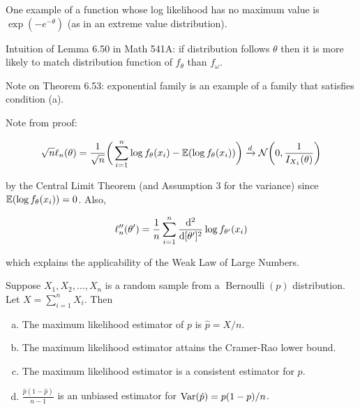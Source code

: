 \begin{remark}One example of a function whose log likelihood has no maximum value is \(\exp(-e^{-\theta})\) (as in an extreme value distribution). 

\end{remark}

\begin{remark} Intuition of Lemma 6.50 in Math 541A: if distribution follows \(\theta\) then it is more likely to match distribution function of \(f_\theta\) than \(f_\omega\).

\end{remark}

Note on Theorem 6.53: exponential family is an example of a family that satisfies condition (a).

Note from proof:

\[
\sqrt{n}\ell_n(\theta) = \frac{1}{\sqrt{n}} \bigg( \sum_{i=1}^n \log f_\theta(x_i) -  \E( \log f_\theta(x_i) ) \bigg) \xrightarrow{d} \mathcal{N} \bigg (0, \frac{1}{I_{X_1}(\theta)} \bigg)
\]

by the Central Limit Theorem (and Assumption 3 for the variance) since \( \E( \log f_\theta(x_i) ) = 0\). Also,

\[
\ell_n''(\theta') = \frac{1}{n} \sum_{i=1}^n \deriv{^2}{[\theta']^2} \log f_{\theta'}(x_i)
\]

which explains the applicability of the Weak Law of Large Numbers.

\begin{proposition} Suppose \(X_1, X_2, \ldots, X_n\) is a random sample from a \(\operatorname{Bernoulli}(p)\) distribution. Let \(X =\sum_{i=1}^n X_i\). Then

\begin{enumerate}[(a)]

\item The maximum likelihood estimator of \(p\) is \( \hat{p} = X/n\).

\item The maximum likelihood estimator attains the Cramer-Rao lower bound.

\item The maximum likelihood estimator is a consistent estimator for \(p\).

\item \( \frac{\hat{p}(1-\hat{p})}{n-1}\) is an unbiased estimator for \(\Var(\hat{p}) = p(1-p)/n\). 

\end{enumerate}

\end{proposition}

